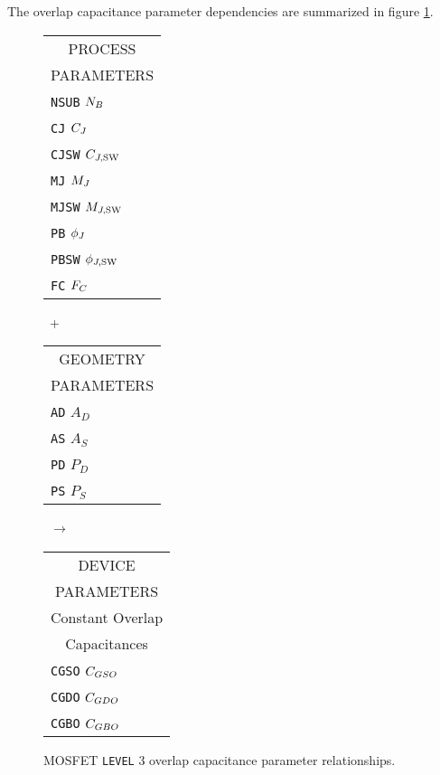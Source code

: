 The overlap capacitance parameter dependencies are summarized in
figure \ref{m3overlap:fig}.
\begin{figure}
\parbox[t]{1.3in}{
\begin{tabular}[t]{|p{1in}|}
\hline
\multicolumn{1}{|c|}{PROCESS} \\
\multicolumn{1}{|c|}{PARAMETERS} \\
\hline
\hline
{\tt NSUB} \hfill $N_B$\\
{\tt CJ} \hfill $C_J$\\
{\tt CJSW} \hfill $C_{J,\mbox{\scriptsize SW}}$\\
{\tt MJ} \hfill $M_J$\\
{\tt MJSW} \hfill $M_{J,\mbox{\scriptsize SW}}$\\
{\tt PB} \hfill $\phi_J$\\
{\tt PBSW} \hfill $\phi_{J,{\mbox{\scriptsize SW}}}$\\
{\tt FC} \hfill $F_C$\\
\hline
\end{tabular}
}
\hfill
\parbox{0.1in}{\ \vspace*{0.2in}\newline +}
\hfill
\begin{tabular}[t]{|p{1in}|}
\hline
\multicolumn{1}{|c|}{GEOMETRY} \\
\multicolumn{1}{|c|}{PARAMETERS} \\
\hline
{\tt AD} \hfill $A_D$\\
{\tt AS} \hfill $A_S$\\
{\tt PD} \hfill $P_D$\\
{\tt PS} \hfill $P_S$\\
\hline
\end{tabular}
\hfill
\parbox{0.1in}{\ \vspace*{0.2in}\newline $\rightarrow$}
\hfill
\begin{tabular}[t]{|p{1.8in}|}
\hline
\multicolumn{1}{|c|}{DEVICE} \\
\multicolumn{1}{|c|}{PARAMETERS} \\
\hline
\hline
\multicolumn{1}{|c|}{Constant Overlap}\\
\multicolumn{1}{|c|}{Capacitances}\\
\hline
{\tt CGSO} \hfill $C_{GSO}$\\
{\tt CGDO} \hfill $C_{GDO}$\\
{\tt CGBO} \hfill $C_{GBO}$\\
\hline
\end{tabular}
\caption{ MOSFET {\tt LEVEL} 3 overlap capacitance parameter relationships.
\label{m3overlap:fig}}
\end{figure}
\vspace*{\fill}

